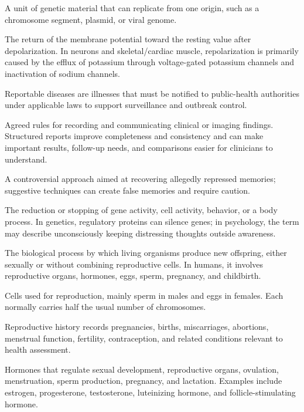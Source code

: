  A unit of genetic material that can replicate from one origin, such as a chromosome segment, plasmid, or viral genome.

 The return of the membrane potential toward the resting value after depolarization. In
neurons and skeletal/cardiac muscle, repolarization is primarily caused by the efflux of
potassium through voltage-gated potassium channels and inactivation of sodium channels.

 Reportable diseases are illnesses that must be notified to public-health authorities under applicable laws to support surveillance and outbreak control.

 Agreed rules for recording and communicating clinical or imaging findings. Structured reports improve completeness and consistency and can make important results, follow-up needs, and comparisons easier for clinicians to understand.

 A controversial approach aimed at recovering allegedly repressed memories; suggestive techniques can create false memories and require caution.

 The reduction or stopping of gene activity, cell activity, behavior, or a body process. In genetics, regulatory proteins can silence genes; in psychology, the term may describe unconsciously keeping distressing thoughts outside awareness.

 The biological process by which living organisms produce new offspring, either sexually or without combining reproductive cells. In humans, it involves reproductive organs, hormones, eggs, sperm, pregnancy, and childbirth.

 Cells used for reproduction, mainly sperm in males and eggs in females. Each normally carries half the usual number of chromosomes.

 Reproductive history records pregnancies, births, miscarriages, abortions, menstrual function, fertility, contraception, and related conditions relevant to health assessment.

 Hormones that regulate sexual development, reproductive organs, ovulation, menstruation, sperm production, pregnancy, and lactation. Examples include estrogen, progesterone, testosterone, luteinizing hormone, and follicle-stimulating hormone.

